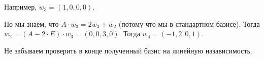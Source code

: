 \documentclass[a4paper]{article}
\begin{document}
\begin{solution}
\begin{options}
            Например, \colorbox{green!30}{$w_3 = (1, 0, 0, 0)$}.

            Но мы знаем, что $A \cdot w_3 = 2w_3 + w_2$ (потому что мы в стандартном базисе). Тогда \colorbox{red!30}{$w_2 = (A - 2 \cdot E) \cdot w_3 = (0, 0, 3, 0)$}. Тогда \colorbox{orange!30}{$w_4 = (-1, 2, 0, 1)$}.
        \end{options}

        Не забываем проверить в конце полученный базис на линейную назависимость.
    \end{solution}
\end{document}
